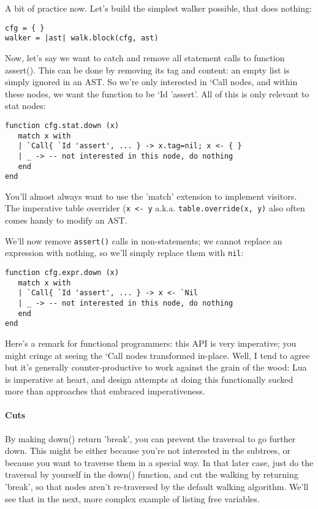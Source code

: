 A bit of practice now. Let's build the simplest walker possible, that does
nothing:

\begin{verbatim}
cfg = { }
walker = |ast| walk.block(cfg, ast)
\end{verbatim}

Now, let's say we want to catch and remove all statement calls to function
assert(). This can be done by removing its tag and content: an empty list is
simply ignored in an AST. So we're only interested in `Call nodes, and within
these nodes, we want the function to be `Id 'assert'. All of this is only
relevant to stat nodes:

\begin{verbatim}
function cfg.stat.down (x)
   match x with
   | `Call{ `Id 'assert', ... } -> x.tag=nil; x <- { }
   | _ -> -- not interested in this node, do nothing
   end
end
\end{verbatim}

You'll almost always want to use the 'match' extension to implement visitors.
The imperative table overrider ({\tt x <- y} a.k.a. {\tt table.override(x, y)}
also often comes handy to modify an AST.

We'll now remove {\tt assert()} calls in non-statements; we cannot
replace an expression with nothing, so we'll simply replace them with
{\tt nil}:

\begin{verbatim}
function cfg.expr.down (x)
   match x with
   | `Call{ `Id 'assert', ... } -> x <- `Nil
   | _ -> -- not interested in this node, do nothing
   end
end
\end{verbatim}


Here's a remark for functional programmers: this API is very imperative; you
might cringe at seeing the `Call nodes transformed in-place. Well, I tend to
agree but it's generally counter-productive to work against the grain of the
wood: Lua is imperative at heart, and design attempts at doing this functionally
sucked more than approaches that embraced imperativeness. 

\paragraph{Cuts}
By making down() return 'break', you can prevent the traversal to go further
down. This might be either because you're not interested in the subtrees, or
because you want to traverse them in a special way. In that later case, just do
the traversal by yourself in the down() function, and cut the walking by
returning 'break', so that nodes aren't re-traversed by the default walking
algorithm. We'll see that in the next, more complex example of listing free
variables.

